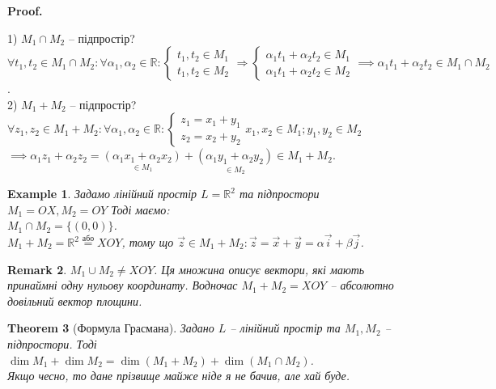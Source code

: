 \documentclass[a4paper, 10pt]{article}
\makeatletter
\theoremstyle{theoremdd}
\newtheorem{theorem}{Theorem}[subsection]
\newtheorem{example}[theorem]{Example}
\newtheorem{remark}[theorem]{Remark}
\renewenvironment{proof}[1][Proof.\\]{\par
\pushQED{\hfill \qed}%
\normalfont \topsep6\p@\@plus6\p@\relax
\trivlist
\item\relax
{\bfseries
#1\@addpunct{.}}\hspace\labelsep\ignorespaces
}{%
\popQED\endtrivlist\@endpefalse
}
\makeatother
\begin{document}
	\begin{proof}
	1) $M_1 \cap M_2$ -- підпростір?\\
	$\forall t_1, t_2 \in M_1 \cap M_2: \forall \alpha_1, \alpha_2 \in \mathbb{R}: \begin{cases} t_1, t_2 \in M_1 \\ t_1, t_2 \in M_2 \end{cases} \Rightarrow \begin{cases} \alpha_1 t_1 + \alpha_2 t_2 \in M_1 \\ \alpha_1 t_1 + \alpha_2 t_2 \in M_2 \end{cases} \implies \alpha_1 t_1 + \alpha_2 t_2 \in M_1 \cap M_2$.
	\bigskip \\
	2) $M_1 + M_2$ -- підпростір?\\
	$\forall z_1, z_2 \in M_1 + M_2: \forall \alpha_1, \alpha_2 \in \mathbb{R}: \begin{cases} z_1 = x_1 + y_1 \\ z_2 = x_2 + y_2 \end{cases}x_1,x_2 \in M_1; y_1, y_2 \in M_2$\\
	$\implies \alpha_1 z_1 + \alpha_2 z_2 = \underset{\in M_1}{(\alpha_1 x_1 + \alpha_2 x_2)} + \underset{\in M_2}{(\alpha_1 y_1 + \alpha_2 y_2)} \in M_1 + M_2$.
	\end{proof}
	
	\begin{example}
	Задамо лінійний простір $L=\mathbb{R}^2$ та підпростори $M_1 = OX, M_2 = OY$ Тоді маємо:\\
	$M_1 \cap M_2 = \{(0,0)\}$.\\
	$M_1 + M_2 = \mathbb{R}^2 \overset{\text{або}}{=} XOY$, тому що $\vec{z} \in M_1 + M_2: \vec{z} = \vec{x} + \vec{y} = \alpha \vec{i} + \beta \vec{j}$.
	\end{example}
	
	\begin{remark}
	$M_1 \cup M_2 \neq XOY$. Ця множина описує вектори, які мають принаймні одну нульову координату. Водночас $M_1 + M_2 = XOY$ -- абсолютно довільний вектор площини.
	\end{remark}
	
	\begin{theorem}[Формула Грасмана]
	Задано $L$ -- лінійний простір та $M_1,M_2$ -- підпростори. Тоді\\
	$\dim{M_1} + \dim{M_2} = \dim(M_1 + M_2) + \dim(M_1 \cap M_2)$.\\
	\textit{Якщо чесно, то дане прізвище майже ніде я не бачив, але хай буде.}
	\end{theorem}
	
\end{document}
